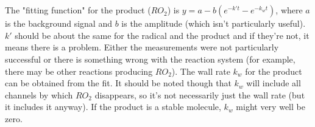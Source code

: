 \documentclass[10pt, a4paper]{article}
\begin{document}
~\\
~\\
The "fitting function" for the product ($RO_2$) is $y = a - b(e^{-k't} - e^{-k_w t})$, where $a$ is the background signal and $b$ is the amplitude (which isn't particularly useful). $k'$ should be about the same for the radical and the product and if they're not, it means there is a problem. Either the measurements were not particularly successful or there is something wrong with the reaction system (for example, there may be other reactions producing $RO_2$). The wall rate $k_w$ for the product can be obtained from the fit. It should be noted though that $k_w$ will include all channels by which $RO_2$ disappears, so it's not necessarily just the wall rate (but it includes it anyway). If the product is a stable molecule, $k_w$ might very well be zero.  
\end{document}
